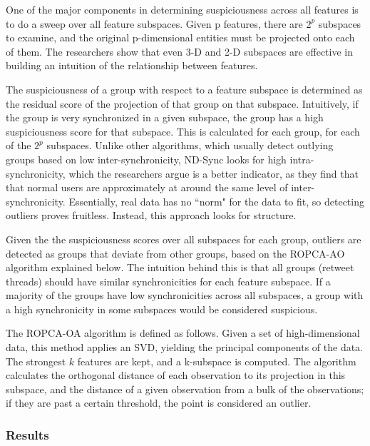 \documentclass[11pt, oneside]{article}   	%
\begin{document}
\quad One of the major components in determining suspiciousness across all features is to do a sweep over all feature subspaces.
Given p features, there are $2^p$ subspaces to examine, and the original p-dimensional entities must be projected onto each of them.
The researchers show that even 3-D and 2-D subspaces are effective in building an intuition of the relationship between features.

\quad The suspiciousness of a group with respect to a feature subspace is determined as the residual score of the projection of that group on that subspace.
Intuitively, if the group is very synchronized in a given subspace, the group has a high suspiciousness score for that subspace.
This is calculated for each group, for each of the $2^p$ subspaces.
Unlike other algorithms, which usually detect outlying groups based on low inter-synchronicity, ND-Sync looks for high intra-synchronicity, which the researchers argue is a better indicator, as they find that that normal users are approximately at around the same level of inter-synchronicity.
Essentially, real data has no ``norm" for the data to fit, so detecting outliers proves fruitless.
Instead, this approach looks for structure.

\quad Given the the suspiciousness scores over all subspaces for each group, outliers are detected as groups that deviate from other groups, based on the ROPCA-AO algorithm explained below.
The intuition behind this is that all groups (retweet threads) should have similar synchronicities for each feature subspace.
If a majority of the groups have low synchronicities across all subspaces, a group with a high synchronicity in some subspaces would be considered suspicious.

\quad The ROPCA-OA algorithm is defined as follows.
Given a set of high-dimensional data, this method applies an SVD, yielding the principal components of the data.
The strongest $k$ features are kept, and a k-subspace is computed.
The algorithm calculates the orthogonal distance of each observation to its projection in this subspace, and the distance of a given observation from a bulk of the observations; if they are past a certain threshold, the point is considered an outlier.

\subsubsection*{Results}
\end{document}
